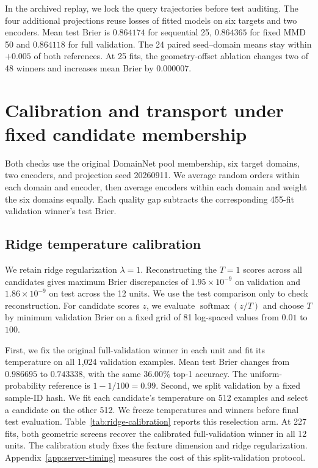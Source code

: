 In the archived replay, we lock the query trajectories before test auditing. The four additional projections reuse losses of fitted models on six targets and two encoders. Mean test Brier is $0.864174$ for sequential 25, $0.864365$ for fixed MMD 50 and $0.864118$ for full validation. The 24 paired seed--domain means stay within $+0.005$ of both references. At 25 fits, the geometry-offset ablation changes two of 48 winners and increases mean Brier by $0.000007$.

\section{Calibration and transport under fixed candidate membership}
\label{app:calibration-transport}
Both checks use the original DomainNet pool membership, six target domains, two encoders, and projection seed 20260911. We average random orders within each domain and encoder, then average encoders within each domain and weight the six domains equally. Each quality gap subtracts the corresponding 455-fit validation winner's test Brier.

\subsection{Ridge temperature calibration}
\label{app:ridge-temperature}
We retain ridge regularization $\lambda=1$. Reconstructing the $T=1$ scores across all candidates gives maximum Brier discrepancies of $1.95\times10^{-9}$ on validation and $1.86\times10^{-9}$ on test across the 12 units. We use the test comparison only to check reconstruction. For candidate scores $z$, we evaluate $\operatorname{softmax}(z/T)$ and choose $T$ by minimum validation Brier on a fixed grid of 81 log-spaced values from $0.01$ to $100$.

First, we fix the original full-validation winner in each unit and fit its temperature on all 1,024 validation examples. Mean test Brier changes from $0.986695$ to $0.743338$, with the same $36.00\%$ top-1 accuracy. The uniform-probability reference is $1-1/100=0.99$. Second, we split validation by a fixed sample-ID hash. We fit each candidate's temperature on 512 examples and select a candidate on the other 512. We freeze temperatures and winners before final test evaluation. Table~\ref{tab:ridge-calibration} reports this reselection arm. At 227 fits, both geometric screens recover the calibrated full-validation winner in all 12 units. The calibration study fixes the feature dimension and ridge regularization. Appendix~\ref{app:server-timing} measures the cost of this split-validation protocol.

